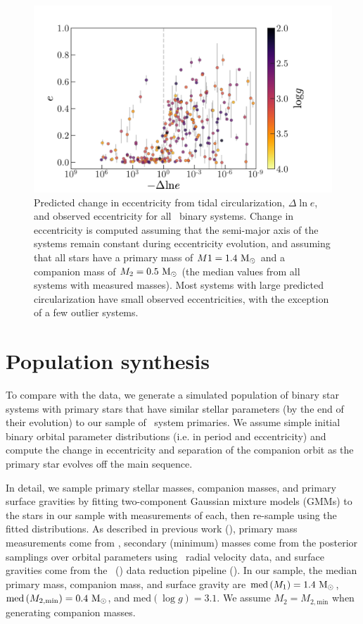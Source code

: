 \documentclass[modern, letterpaper]{aastex62}
\newcommand{\apogee}{\project{\acronym{APOGEE}}}
\newcommand{\DR}{\acronym{DR14}}
\newcommand{\logg}{\ensuremath{\log g}}
\newcommand{\med}[1]{\ensuremath{\textrm{med}\left(#1\right)}}
\begin{document}
\begin{figure}[h]
\begin{center}
\includegraphics[width=\textwidth]{dlne}
\end{center}
\caption{%
Predicted change in eccentricity from tidal circularization, $\Delta \ln e$, and
observed eccentricity for all \apogee\ binary systems.
Change in eccentricity is computed assuming that the semi-major axis of the
systems remain constant during eccentricity evolution, and assuming that all
stars have a primary mass of $M1 = 1.4~\mathrm{M}_\odot$ and a companion mass of $M_2 =
0.5~\mathrm{M}_\odot$ (the median values from all systems with measured masses).
Most systems with large predicted circularization have small observed
eccentricities, with the exception of a few outlier systems.
\label{fig:dlne}
}
\end{figure}


\section{Population synthesis}
\label{sec:theory}

To compare with the data, we generate a simulated population of binary star
systems with primary stars that have similar stellar parameters (by the end of
their evolution) to our sample of \apogee\ system primaries.
We assume simple initial binary orbital parameter distributions (i.e. in period
and eccentricity) and compute the change in eccentricity and separation of the
companion orbit as the primary star evolves off the main sequence.

In detail, we sample primary stellar masses, companion masses, and primary
surface gravities by fitting two-component Gaussian mixture models (GMMs) to the
stars in our sample with measurements of each, then re-sample using the fitted
distributions.
As described in previous work (\citealt{Price-Whelan:2018}), primary mass
measurements come from \cite{Ness:2015}, secondary (minimum) masses come from
the posterior samplings over orbital parameters using \apogee\ radial velocity
data, and surface gravities come from the \apogee\ (\DR) data reduction pipeline
(\citealt{Garcia-Perez:2016}).
In our sample, the median primary mass, companion mass, and surface gravity are
$\med{M_1} = 1.4~\msun$, $\med{M_{2, \textrm{min}}} = 0.4~\msun$, and
$\med{\logg} = 3.1$.
We assume $M_2 = M_{2, \textrm{min}}$ when generating companion masses.
\end{document}
